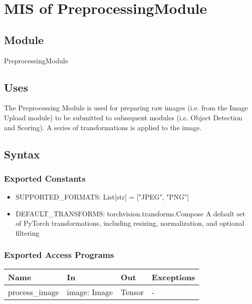 \documentclass[12pt, titlepage]{article}
\begin{document}
\newpage

\section{MIS of PreprocessingModule} \label{Module} 

\subsection{Module}

PreprocessingModule

\subsection{Uses}
The Preprocessing Module is used for preparing raw images (i.e. from the Image Upload module) to be submitted to subsequent modules (i.e. Object Detection and Scoring). A series of transformations is applied to the image.

\subsection{Syntax}

\subsubsection{Exported Constants}

\begin{itemize}
  \item SUPPORTED{\_}FORMATS: List[str] = ["JPEG", "PNG"]
  \item DEFAULT{\_}TRANSFORMS: torchvision.transforms.Compose\: A default set of PyTorch transformations, including resizing, normalization, and optional filtering
\end{itemize}

\subsubsection{Exported Access Programs}

\begin{center}
\begin{tabular}{p{5cm} p{3cm} p{3cm} p{2cm}}
\hline
\textbf{Name} & \textbf{In} & \textbf{Out} & \textbf{Exceptions} \\
\hline
process{\_}image & image: Image & Tensor & - \\
\hline
\end{tabular}
\end{center}
\end{document}
